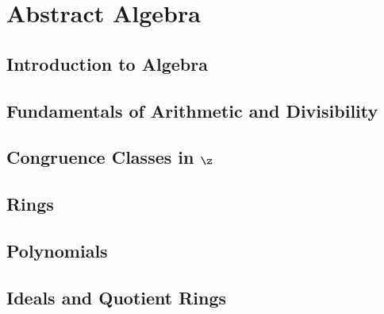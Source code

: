 
\renewcommand{\pp}[1]{p_{#1}}
\renewcommand{\q}[1]{q_{#1}}

\part{Abstract Algebra}

\chapter{Introduction to Algebra}\label{ch:chap1}







\chapter{Fundamentals of Arithmetic and Divisibility}





\chapter{Congruence Classes in $\z$}





\chapter{Rings}




\chapter{Polynomials}






\chapter{Ideals and Quotient Rings}

